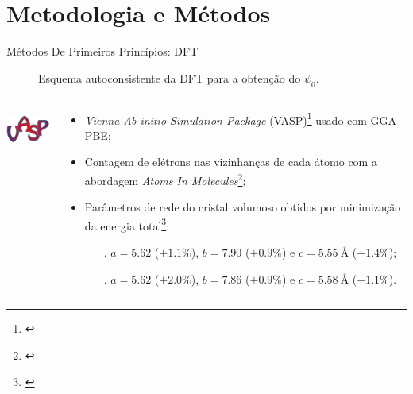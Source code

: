 \section{Metodologia e Métodos}

\begin{frame}{Métodos De Primeiros Princípios: DFT}
	\begin{figure}[t]
		\centering
		{\footnotesize}
		\caption{Esquema autoconsistente da DFT para a obtenção do $\psi_0$.\label{fig:flowdft}}
	\end{figure}
	\begin{columns}
		\begin{column}{.175\textwidth}
			\includegraphics[height=50px]{../floats/logo_vasp.png}
		\end{column}
		\begin{column}{.825\textwidth}\fontsize{7}{7}
			\begin{itemize}
				\item \textit{Vienna Ab initio Simulation Package} (VASP)\footnote[frame]{\cite{kresse_efficient_1996,kresse_ultrasoft_1999}} usado com GGA-PBE;
				\item Contagem de elétrons nas vizinhanças de cada átomo com a abordagem \emph{Atoms In Molecules}\footnote[frame]{\cite{bader_quantum_1981}};
				\item Parâmetros de rede do cristal volumoso obtidos por minimização da energia total\footnote[frame]{\cite{george_effect_2018,hu_influence_2007}}:
				\begin{itemize}\footnotesize
					\item[\ce{NaNbO3}.] $a = 5.62$ ($+1.1\%$), $b = 7.90$ ($+0.9\%$) e $c = \SI{5.55}{\angstrom}$ ($+1.4\%$);
					\item[\ce{NaTaO3}.] $a = 5.62$ ($+2.0\%$), $b = 7.86$ ($+0.9\%$) e $c = \SI{5.58}{\angstrom}$ ($+1.1\%$).
				\end{itemize}
			\end{itemize}
		\end{column}
	\end{columns}
\end{frame}
